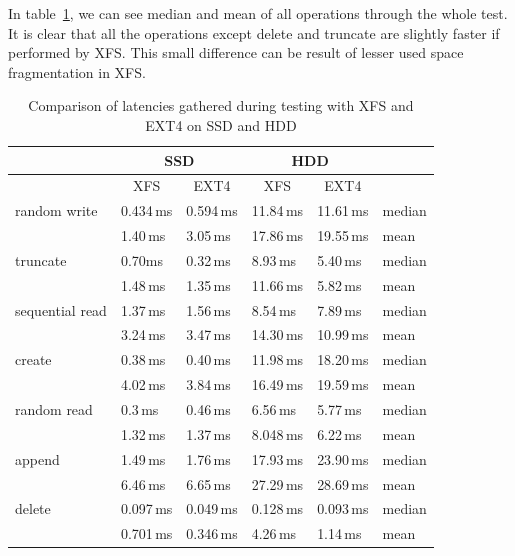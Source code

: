 \documentclass[
  color, %
  table, %
  lof,   %
  lot,   %
]{fithesis3}
\begin{document}
In table~\ref{tab:hdd_ssd_xfs_ext4}, we can see median and mean of all operations through the whole test. It is clear that all the operations except delete and truncate are slightly faster if performed by XFS. This small difference can be result of lesser used space fragmentation in XFS.

\begin{table}
\centering

\begin{tabular}{|l|l|l|l|l|l|}
\hline
   & \multicolumn{2}{|c|}{SSD} & \multicolumn{2}{|c|}{HDD} & \\ \hline

 & \multicolumn{1}{|c|}{XFS} & \multicolumn{1}{|c|}{EXT4} & \multicolumn{1}{|c|}{XFS} & \multicolumn{1}{|c|}{EXT4} &  \\
\hline
    random write & 0.434\,ms & 0.594\,ms & 11.84\,ms & 11.61\,ms & median\\
 \hline
                 & 1.40\,ms & 3.05\,ms & 17.86\,ms & 19.55\,ms & mean\\
    \hline
        truncate & 0.70ms & 0.32\,ms & 8.93\,ms & 5.40\,ms & median\\
    \hline
                 & 1.48\,ms & 1.35\,ms& 11.66\,ms & 5.82\,ms & mean\\
    \hline
           sequential read & 1.37\,ms & 1.56\,ms & 8.54\,ms & 7.89\,ms & median\\
    \hline
                 & 3.24\,ms & 3.47\,ms & 14.30\,ms & 10.99\,ms & mean\\
    \hline
          create & 0.38\,ms & 0.40\,ms & 11.98\,ms & 18.20\,ms & median\\
    \hline
                 & 4.02\,ms & 3.84\,ms & 16.49\,ms & 19.59\,ms & mean\\
    \hline
     random read & 0.3\,ms & 0.46\,ms & 6.56\,ms & 5.77\,ms & median\\
    \hline
                 & 1.32\,ms & 1.37\,ms & 8.048\,ms  & 6.22\,ms &mean\\
    \hline
          append & 1.49\,ms & 1.76\,ms & 17.93\,ms & 23.90\,ms & median \\
    \hline
                 & 6.46\,ms & 6.65\,ms & 27.29\,ms & 28.69\,ms &mean\\
    \hline
          delete & 0.097\,ms & 0.049\,ms & 0.128\,ms & 0.093\,ms & median\\
    \hline
                & 0.701\,ms & 0.346\,ms & 4.26\,ms & 1.14\,ms & mean\\
    \hline
\end{tabular}
\caption{Comparison of latencies gathered during testing with XFS and EXT4 on SSD and HDD}
\label{tab:hdd_ssd_xfs_ext4}
\end{table}
\end{document}
